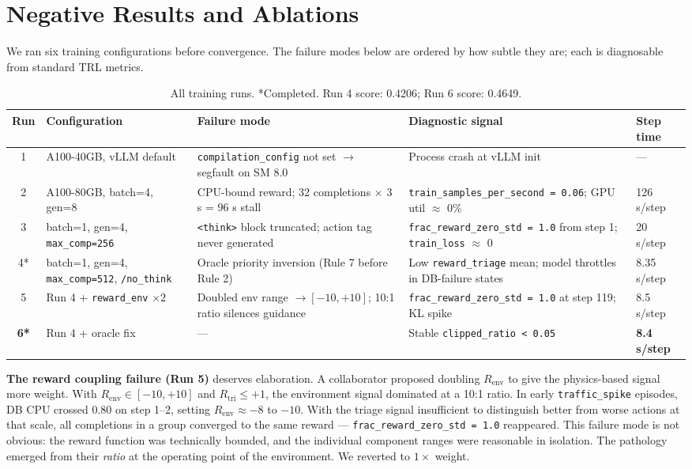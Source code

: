 \documentclass{article}
\begin{document}
\section{Negative Results and Ablations}

We ran six training configurations before convergence. The failure modes below are
ordered by how subtle they are; each is diagnosable from standard TRL metrics.

\begin{table}[h]
\centering
\small
\begin{tabular}{clp{4cm}p{4.5cm}l}
\toprule
\textbf{Run} & \textbf{Configuration} & \textbf{Failure mode} & \textbf{Diagnostic signal} & \textbf{Step time} \\
\midrule
1 & A100-40GB, vLLM default & \texttt{compilation\_config} not set $\to$ segfault on SM 8.0 & Process crash at vLLM init & --- \\
2 & A100-80GB, batch=4, gen=8 & CPU-bound reward; 32 completions $\times$ 3 s = 96 s stall & \texttt{train\_samples\_per\_second = 0.06}; GPU util $\approx$ 0\% & 126 s/step \\
3 & batch=1, gen=4, \texttt{max\_comp=256} & \texttt{<think>} block truncated; action tag never generated & \texttt{frac\_reward\_zero\_std = 1.0} from step 1; \texttt{train\_loss} $\approx$ 0 & 20 s/step \\
4* & batch=1, gen=4, \texttt{max\_comp=512}, \texttt{/no\_think} & Oracle priority inversion (Rule 7 before Rule 2) & Low \texttt{reward\_triage} mean; model throttles in DB-failure states & 8.35 s/step \\
5 & Run 4 + \texttt{reward\_env} $\times 2$ & Doubled env range $\to [-10,+10]$; 10:1 ratio silences guidance & \texttt{frac\_reward\_zero\_std = 1.0} at step 119; KL spike & 8.5 s/step \\
\textbf{6*} & Run 4 + oracle fix & --- & Stable \texttt{clipped\_ratio < 0.05} & \textbf{8.4 s/step} \\
\bottomrule
\end{tabular}
\caption{All training runs. *Completed. Run 4 score: 0.4206; Run 6 score: 0.4649.}
\end{table}

\textbf{The reward coupling failure (Run 5)} deserves elaboration. A collaborator
proposed doubling $R_{\mathrm{env}}$ to give the physics-based signal more weight. With
$R_{\mathrm{env}} \in [-10, +10]$ and $R_{\mathrm{tri}} \leq +1$, the environment
signal dominated at a 10:1 ratio. In early \texttt{traffic\_spike} episodes, DB CPU
crossed 0.80 on step 1--2, setting $R_{\mathrm{env}} \approx -8$ to $-10$. With the
triage signal insufficient to distinguish better from worse actions at that scale, all
completions in a group converged to the same reward ---
\texttt{frac\_reward\_zero\_std = 1.0} reappeared. This failure mode is not obvious:
the reward function was technically bounded, and the individual component ranges were
reasonable in isolation. The pathology emerged from their \textit{ratio} at the
operating point of the environment. We reverted to $1\times$ weight.
\end{document}
